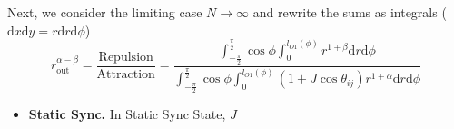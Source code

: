 \documentclass[10pt,aspectratio=43,mathserif,table]{beamer}
\begin{document}
\begin{frame}
    Next, we consider the limiting case $N \rightarrow \infty$
    and rewrite the sums as integrals ($\mathrm{d}x\mathrm{d}y = r\mathrm{d}r\mathrm{d}\phi$)
    \vspace{-0.3cm}
    $$
    r_{\mathrm{out}}^{\alpha -\beta}=\frac{\mathrm{Repulsion}}{\mathrm{Attraction}}=\frac{\int_{-\frac{\pi}{2}}^{\frac{\pi}{2}}{\cos \phi \int_0^{l_{O1}\left( \phi \right)}{r^{1+\beta}\mathrm{d}r\mathrm{d}\phi}}}{\int_{-\frac{\pi}{2}}^{\frac{\pi}{2}}{\cos \phi \int_0^{l_{O1}\left( \phi \right)}{\left( 1+J\cos \theta _{ij} \right) r^{1+\alpha}\mathrm{d}r\mathrm{d}\phi}}}
    $$
\end{frame}

\begin{frame}
    \begin{itemize}
        \item \textbf{Static Sync.} In Static Sync State, $J$
    \end{itemize}
\end{frame}




\end{document}
